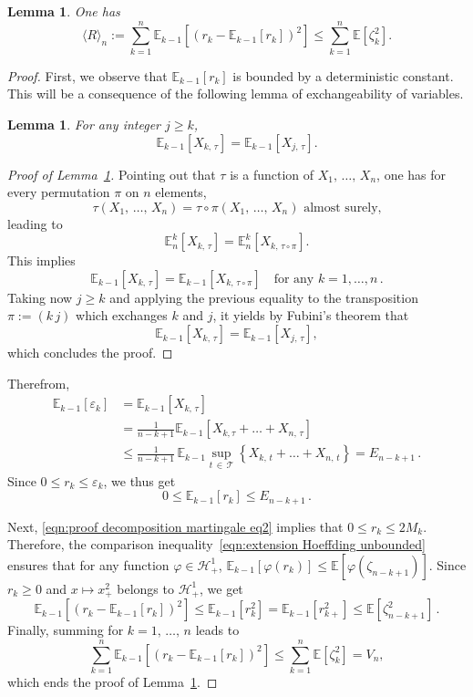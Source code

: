 \documentclass[10pt]{amsart}
\newtheorem{lemm}[theo]{Lemma}\newtheorem{prop}[theo]{Proposition}\newtheorem{coro}[theo]{Corollary}\newtheorem{conj}[theo]{Conjecture}
\theoremstyle{definition}\newtheorem{defi}[theo]{Definition}\newtheorem{rema}[theo]{Remark}\newtheorem{exam}[theo]{Example}\newtheorem{exem}[theo]{Example}\newtheorem{nota}[theo]{Notation}
\newcommand{\bE}{\mathbb{E}}
\newcommand{\cH}{\mathcal{H}}
\newcommand{\cT}{\mathcal{T}}
\begin{document}
\begin{lemm}\label{lem:upper bound quad var R}
One has
\[
\langle R \rangle_n:=\sum_{k=1}^n\bE_{k-1}\left[\left(r_k-\bE_{k-1}[r_k]\right)^2\right]\leq\sum_{k=1}^n \bE\left[\zeta_{k}^2\right].
\]
\end{lemm}


\begin{proof}
First, we observe that $\bE_{k-1}[r_k]$ is bounded by a deterministic constant. This will be a consequence of the following lemma of exchangeability of variables.


\begin{lemm}\label{lem:exchangeability}
For any integer $j\geq k$,
\[
\bE_{k-1}\left[X_{k,\,\tau}\right]=\bE_{k-1}\left[X_{j,\,\tau}\right].
\]
\end{lemm}


\begin{proof}[Proof of Lemma~\ref{lem:exchangeability}]
Pointing out that $\tau$ is a function of $X_1,\,\ldots,\,X_n$, one has for every permutation $\pi$ on $n$ elements,
\[
\tau(X_1,\,\ldots,\,X_n)=\tau\circ\pi(X_1,\,\ldots,\,X_n) \text{ almost surely,}
\]
leading to
\[
\bE_n^k[X_{k,\,\tau}]=\bE_n^k[X_{k,\,\tau\circ\pi}].
\]
This implies
\[
\bE_{k-1}[X_{k,\,\tau}]=\bE_{k-1}[X_{k,\,\tau\circ\pi}]\quad \text{for any }k=1,\ldots,n\,.
\]
Taking now $j\geq k$ and applying the previous equality to the transposition $\pi:=(k\,j)$ which exchanges $k$ and $j$, it yields by Fubini's theorem that
\[
\bE_{k-1}\left[X_{k,\,\tau}\right]=\bE_{k-1}\left[X_{j,\,\tau}\right],
\]
which concludes the proof.
\end{proof}

Therefrom,
\begin{equation}
\begin{aligned}
\bE_{k-1}[\varepsilon_k] &= \bE_{k-1}[X_{k,\,\tau}]\\
&=\frac{1}{n-k+1} \bE_{k-1}\left[X_{k,\tau}+\ldots+X_{n,\,\tau}\right]\\
&\leq \frac{1}{n-k+1} \,\bE_{k-1}\sup_{t\,\in\,\cT}\left\{X_{k,\,t}+\ldots + X_{n,\,t}\right\}=E_{n-k+1}\,.
\end{aligned}
\end{equation}
Since $0\leq r_k\leq\varepsilon_k$, we thus get
\[
0\leq \bE_{k-1}[r_k]\leq E_{n-k+1}\,.
\]

Next, \eqref{eqn:proof decomposition martingale eq2} implies that $0\leq r_k\leq 2M_k$. Therefore, the comparison inequality~\eqref{eqn:extension Hoeffding unbounded} ensures that for any function $\varphi\in\cH_+^1$, $\bE_{k-1}[\varphi(r_k)]\leq\bE[\varphi(\zeta_{n-k+1})]$. Since $r_k\geq0$ and $x\mapsto x_+^2$ belongs to $\cH_+^1$, we get
\[
\bE_{k-1}\left[\left(r_k-\bE_{k-1}[r_k]\right)^2\right]\leq\bE_{k-1}\left[r_k^2\right]=\bE_{k-1}\left[r_{k+}^2\right] \leq \bE\left[\zeta_{n-k+1}^2\right]\,.
\]
Finally, summing for $k=1,\,\ldots,\,n$ leads to
\begin{equation}\label{eqn:bound quad var R}
\sum_{k=1}^n\bE_{k-1}\left[\left(r_k-\bE_{k-1}[r_k]\right)^2\right] \leq \sum_{k=1}^n\bE\left[\zeta_k^2\right]=V_n,
\end{equation}
which ends the proof of Lemma~\ref{lem:upper bound quad var R}.
\end{proof}
\end{document}

